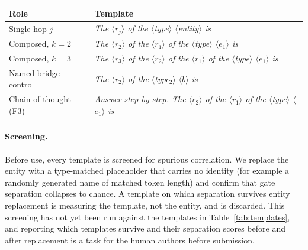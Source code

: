 \documentclass{article}
\newcommand{\prompt}[1]{\textit{#1}}
\newcommand{\slot}[1]{\ensuremath{\langle}#1\ensuremath{\rangle}}
\begin{document}
\begin{center}
\small
{}
\label{tab:templates}
\vspace{1pt}
\begin{tabular}{@{}lp{9.4cm}@{}}
\toprule
\textbf{Role} & \textbf{Template}\\
\midrule
Single hop $j$ & \prompt{The \slot{$r_j$} of the \slot{type} \slot{entity} is}\\
Composed, $k{=}2$ & \prompt{The \slot{$r_2$} of the \slot{$r_1$} of the \slot{type} \slot{$e_1$} is}\\
Composed, $k{=}3$ & \prompt{The \slot{$r_3$} of the \slot{$r_2$} of the \slot{$r_1$} of the \slot{type} \slot{$e_1$} is}\\
Named-bridge control & \prompt{The \slot{$r_2$} of the \slot{type$_2$} \slot{$b$} is}\\
Chain of thought (F3) & \prompt{Answer step by step. The \slot{$r_2$} of the \slot{$r_1$} of the
\slot{type} \slot{$e_1$} is}\\
\bottomrule
\end{tabular}
\vspace{-1.15em}
\end{center}

\paragraph{Screening.} Before use, every template is screened for spurious correlation. We replace
the entity with a type-matched placeholder that carries no identity (for example a randomly generated
name of matched token length) and confirm that gate separation collapses to chance. A template on
which separation survives entity replacement is measuring the template, not the entity, and is
discarded. This screening has not yet been run against the templates in Table~\ref{tab:templates}, and
reporting which templates survive and their separation scores before and after replacement is a
task for the human authors before submission.
\end{document}
